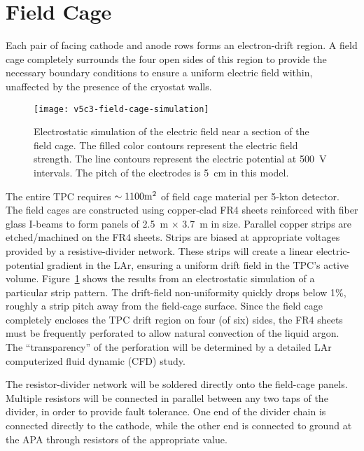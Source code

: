 \section{Field Cage}
\label{subsec:v5-tpc-chamber-fieldcage}

Each pair of facing cathode and anode rows forms an electron-drift region. 
A field cage  completely surrounds the four open sides of this region
to provide the necessary boundary conditions to ensure a uniform electric field within, unaffected by the presence of the cryostat walls.

\begin{figure}[htbp]
\centering
\texttt{[image: v5c3-field-cage-simulation]}
\caption[Electrostatic simulation of electric field near a section 
of field cage]{Electrostatic simulation of the electric field near a section 
of the field cage.  The filled color contours represent the electric 
field strength.  The line contours represent the electric
potential at 500~V intervals.  The pitch of the electrodes is 5~cm in this model. }
\label{fig:tpc-field-cage}
\end{figure}    

The entire TPC requires $\sim 1100 \rm{m}^2$ of field 
cage material per 5-kton detector. The field cages are constructed using copper-clad FR4 sheets reinforced with fiber glass I-beams to form panels of 2.5~m $\times$ 3.7~m in size. Parallel copper strips are etched/machined
on the FR4 sheets. Strips are 
biased at appropriate voltages provided by a resistive-divider network. These strips will create
a linear electric-potential gradient in the LAr, ensuring a uniform drift 
field in the TPC's active volume.  Figure~\ref{fig:tpc-field-cage} shows 
the results from an electrostatic simulation of a particular strip pattern. 
The drift-field non-uniformity quickly drops below 1\%, roughly 
a strip pitch away from the field-cage surface. Since the field cage 
completely encloses the TPC drift region on four (of six) sides, the FR4 sheets must 
be frequently perforated to allow natural convection of the liquid argon.  
The ``transparency'' of the perforation will be determined by a 
detailed LAr computerized fluid dynamic (CFD) study.

The resistor-divider network will be soldered directly onto the field-cage panels. 
Multiple resistors will be connected in parallel between any two taps of the divider,
in order to provide fault tolerance. 
One end of the divider chain is connected directly to the cathode, while the other end is connected to ground at the APA through resistors of the appropriate value. 

